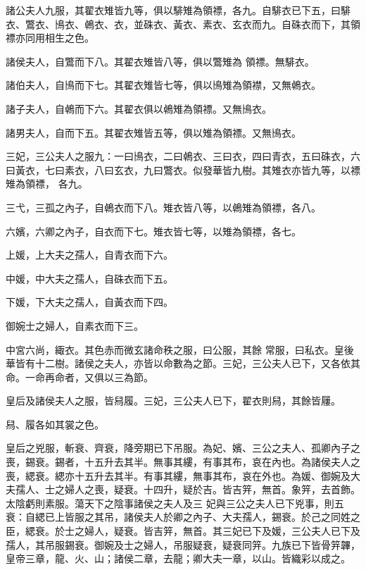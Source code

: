 \begin{pinyinscope}
 諸公夫人九服，其翟衣雉皆九等，俱以騑雉為領褾，各九。自騑衣已下五，曰騑衣、鷩衣、鳪衣、鵫衣、衣，並硃衣、黃衣、素衣、玄衣而九。自硃衣而下，其領褾亦同用相生之色。



 諸侯夫人，自鷩而下八。其翟衣雉皆八等，俱以鷩雉為
 領褾。無騑衣。



 諸伯夫人，自鳪而下七。其翟衣雉皆七等，俱以鳪雉為領襟，又無鵫衣。



 諸子夫人，自鵫而下六。其翟衣俱以鵫雉為領褾。又無鳪衣。



 諸男夫人，自而下五。其翟衣雉皆五等，俱以雉為領褾。又無鳪衣。



 三妃，三公夫人之服九：一曰鳪衣，二曰鵫衣、三曰衣，四曰青衣，五曰硃衣，六曰黃衣，七曰素衣，八曰玄衣，九曰鷩衣。似發華皆九樹。其雉衣亦皆九等，以褾雉為領褾，
 各九。



 三弋，三孤之內子，自鵫衣而下八。雉衣皆八等，以鵫雉為領褾，各八。



 六嬪，六卿之內子，自衣而下七。雉衣皆七等，以雉為領褾，各七。



 上媛，上大夫之孺人，自青衣而下六。



 中媛，中大夫之孺人，自硃衣而下五。



 下媛，下大夫之孺人，自黃衣而下四。



 御婉士之婦人，自素衣而下三。



 中宮六尚，緅衣。其色赤而微玄諸命秩之服，曰公服，其餘
 常服，曰私衣。皇後華皆有十二樹。諸侯之夫人，亦皆以命數為之節。三妃，三公夫人已下，又各依其命。一命再命者，又俱以三為節。



 皇后及諸侯夫人之服，皆舄履。三妃，三公夫人已下，翟衣則舄，其餘皆屨。



 舄、履各如其裳之色。



 皇后之兇服，斬衰、齊衰，降旁期已下吊服。為妃、嬪、三公之夫人、孤卿內子之喪，錫衰。錫者，十五升去其半。無事其縷，有事其布，哀在內也。為諸侯夫人之喪，緦衰。緦亦十五升去其半。有事其縷，無事其布，哀在外也。為媛、御婉及大夫孺人、士之婦人之喪，疑衰。十四升，疑於吉。皆吉笄，無首。象笄，去首飾。太陰虧則素服。蕩天下之陰事諸侯之夫人及三
 妃與三公之夫人已下兇事，則五衰：自緦已上皆服之其吊，諸侯夫人於卿之內子、大夫孺人，錫衰。於己之同姓之臣，緦衰。於士之婦人，疑衰。皆吉笄，無首。其三妃已下及媛，三公夫人已下及孺人，其吊服錫衰。御婉及士之婦人，吊服疑衰，疑衰同笄。九族已下皆骨笄韠，皇帝三章，龍、火、山；諸侯二章，去龍；卿大夫一章，以山。皆織彩以成之。




\end{pinyinscope}
